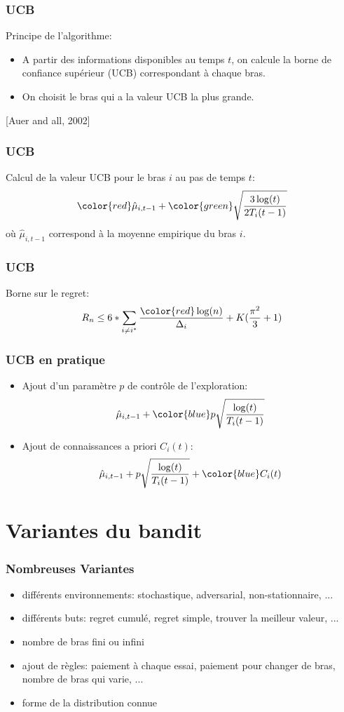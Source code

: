\documentclass{beamer}
\begin{document}
\begin{frame}
    \frametitle{UCB}
    Principe de l'algorithme:
    \begin{itemize}
        \item A partir des informations disponibles au temps $t$, on calcule la borne de confiance supérieur (UCB) correspondant à chaque bras.
        \item On choisit le bras qui a la valeur UCB la plus grande.
    \end{itemize}
    \hfill [Auer and all, 2002]
\end{frame}

\begin{frame}
    \frametitle{UCB}
    Calcul de la valeur UCB pour le bras $i$ au pas de temps $t$:
    $$ {\color{red} \hat{\mu}_{i,t-1}} + {\color{green} \sqrt{\frac{3\log(t)}{2T_i(t-1)}}} $$
    où $\hat{\mu}_{i,t-1} $ correspond à la moyenne empirique du bras $i$.
    
\end{frame}

\begin{frame}
    \frametitle{UCB}
    Borne sur le regret:
    $$ R_n \le 6*\sum_{i \ne i^*}\frac{\color{red}\log(n)}{\Delta_i} + K(\frac{\pi^2}{3}+1) $$
    
\end{frame}



\begin{frame}
    \frametitle{UCB en pratique}
    \begin{itemize}
        \item Ajout d'un paramètre $p$ de contrôle de l'exploration:
            $$ \hat{\mu}_{i,t-1} + {\color{blue}p} \sqrt{\frac{\log(t)}{T_i(t-1)}} $$
        \item Ajout de connaissances a priori $C_i(t)$:
            $$ \hat{\mu}_{i,t-1} + p \sqrt{\frac{\log(t)}{T_i(t-1)}} + {\color{blue} C_i(t)} $$
    \end{itemize}
    
\end{frame}

\section{Variantes du bandit}

\begin{frame}
    \frametitle{Nombreuses Variantes}
    \begin{itemize}
        \item différents environnements: {\color{blue}stochastique}, adversarial, non-stationnaire, ...
        \item différents buts: {\color{blue}regret cumulé}, regret simple, trouver la meilleur valeur, ...
        \item nombre de bras {\color{blue}fini} ou infini
        \item ajout de règles: paiement à chaque essai, paiement pour changer de bras, nombre de bras qui varie, ...
        \item forme de la distribution connue
    \end{itemize}
\end{frame}
\end{document}
